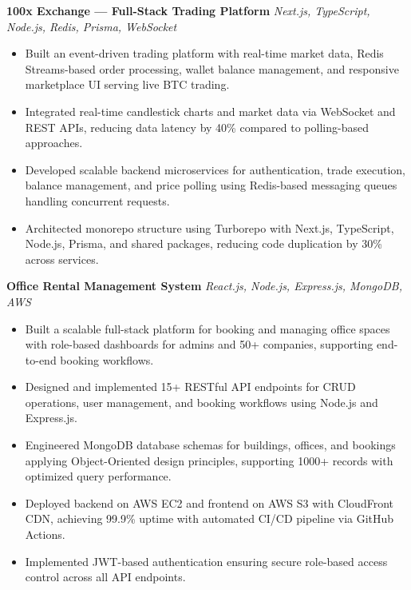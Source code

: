 \documentclass[10pt,a4paper]{article}
\begin{document}
\textbf{100x Exchange — Full-Stack Trading Platform}
\hfill
\textit{Next.js, TypeScript, Node.js, Redis, Prisma, WebSocket}

\begin{itemize}
    \item Built an event-driven trading platform with real-time market data, Redis Streams-based order processing, wallet balance management, and responsive marketplace UI serving live BTC trading.
    
    \item Integrated real-time candlestick charts and market data via WebSocket and REST APIs, reducing data latency by 40\% compared to polling-based approaches.
    
    \item Developed scalable backend microservices for authentication, trade execution, balance management, and price polling using Redis-based messaging queues handling concurrent requests.
    
    \item Architected monorepo structure using Turborepo with Next.js, TypeScript, Node.js, Prisma, and shared packages, reducing code duplication by 30\% across services.
\end{itemize}

\textbf{Office Rental Management System}
\hfill
\textit{React.js, Node.js, Express.js, MongoDB, AWS}

\begin{itemize}
    \item Built a scalable full-stack platform for booking and managing office spaces with role-based dashboards for admins and 50+ companies, supporting end-to-end booking workflows.
    
    \item Designed and implemented 15+ RESTful API endpoints for CRUD operations, user management, and booking workflows using Node.js and Express.js.
    
    \item Engineered MongoDB database schemas for buildings, offices, and bookings applying Object-Oriented design principles, supporting 1000+ records with optimized query performance.
    
    \item Deployed backend on AWS EC2 and frontend on AWS S3 with CloudFront CDN, achieving 99.9\% uptime with automated CI/CD pipeline via GitHub Actions.
    
    \item Implemented JWT-based authentication ensuring secure role-based access control across all API endpoints.
\end{itemize}
\end{document}
